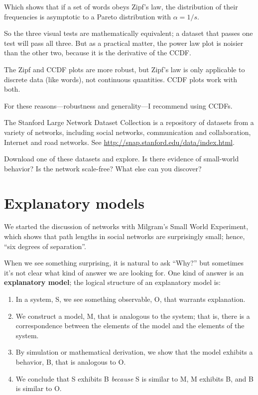 \documentclass[10pt]{book}
\begin{document}
Which shows that if a set of words obeys Zipf's law, the
distribution of their frequencies is asymptotic to a
Pareto distribution with $\alpha = 1/s$.

So the three visual tests are mathematically equivalent; a dataset
that passes one test will pass all three.  But as a practical
matter, the power law plot is noisier than the other two, because
it is the derivative of the CCDF.

The Zipf and CCDF plots are more robust, but Zipf's law is only
applicable to discrete data (like words), not continuous quantities.
CCDF plots work with both.

For these reasons---robustness and generality---I recommend
using CCDFs.


\begin{ex}

The Stanford Large Network Dataset Collection is a repository of
datasets from a variety of networks, including social networks,
communication and collaboration, Internet and road networks.
See \url{http://snap.stanford.edu/data/index.html}.

Download one of these datasets and explore.  Is there evidence
of small-world behavior?  Is the network scale-free?  What else
can you discover?

\end{ex}


\section{Explanatory models}

We started the discussion of networks with Milgram's Small World
Experiment, which shows that path lengths in social
networks are surprisingly small; hence, ``six degrees of separation''.

When we see something surprising, it is natural to ask ``Why?''
but sometimes it's not clear what kind of answer we are looking
for.  One kind of answer is an {\bf explanatory model}; the logical
structure of an explanatory model is:

\begin{enumerate}

\item In a system, S, we see something observable, O, that warrants
  explanation.

\item We construct a model, M, that is analogous to the system; that
  is, there is a correspondence between the elements of the model and
  the elements of the system.

\item By simulation or mathematical derivation, we show that the model
  exhibits a behavior, B, that is analogous to O.

\item We conclude that S exhibits B {\em because} S is similar to M, M
  exhibits B, and B is similar to O.

\end{enumerate}
\end{document}
